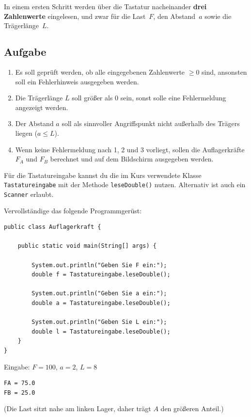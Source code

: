 \documentclass[
	fontsize=12pt,          %
	paper=a4,               %
	numbers=noenddot,       %
	listof=totoc,           %
	listof=entryprefix,     %
	listof=nochaptergap,    %
	bibliography=totoc,     %
	parskip=half            %
	openany                 %
]{scrbook}
\begin{document}
\medskip
In einem ersten Schritt werden über die Tastatur nacheinander \textbf{drei Zahlenwerte} eingelesen, und zwar für die Last~$F$, den Abstand~$a$ sowie die Trägerlänge~$L$.

\subsection*{Aufgabe}

\begin{enumerate}[label=\textbf{\arabic*.)}]
	\item Es soll geprüft werden, ob alle eingegebenen Zahlenwerte $\geq 0$ sind, ansonsten soll ein Fehlerhinweis ausgegeben werden.

	\item Die Trägerlänge $L$ soll größer als 0 sein, sonst solle eine Fehlermeldung angezeigt werden.

	\item Der Abstand $a$ soll als sinnvoller Angriffspunkt nicht außerhalb des Trägers liegen ($a \leq L$).

	\item Wenn keine Fehlermeldung nach 1, 2 und 3 vorliegt, sollen die Auflagerkräfte $F_A$ und $F_B$ berechnet und auf dem Bildschirm ausgegeben werden.
\end{enumerate}

\begin{hinweis}
	Für die Tastatureingabe kannst du die im Kurs verwendete Klasse \texttt{Tastatureingabe} mit der Methode \texttt{leseDouble()} nutzen. Alternativ ist auch ein \texttt{Scanner} erlaubt.
\end{hinweis}

\medskip
Vervollständige das folgende Programmgerüst:

\begin{lstlisting}
public class Auflagerkraft {

    public static void main(String[] args) {

        System.out.println("Geben Sie F ein:");
        double f = Tastatureingabe.leseDouble();

        System.out.println("Geben Sie a ein:");
        double a = Tastatureingabe.leseDouble();

        System.out.println("Geben Sie L ein:");
        double l = Tastatureingabe.leseDouble();
    }
}
\end{lstlisting}

\begin{beispiel}
	Eingabe: $F = 100$, $a = 2$, $L = 8$
	\begin{verbatim}
FA = 75.0
FB = 25.0
	\end{verbatim}
	(Die Last sitzt nahe am linken Lager, daher trägt $A$ den größeren Anteil.)
\end{beispiel}
\end{document}
